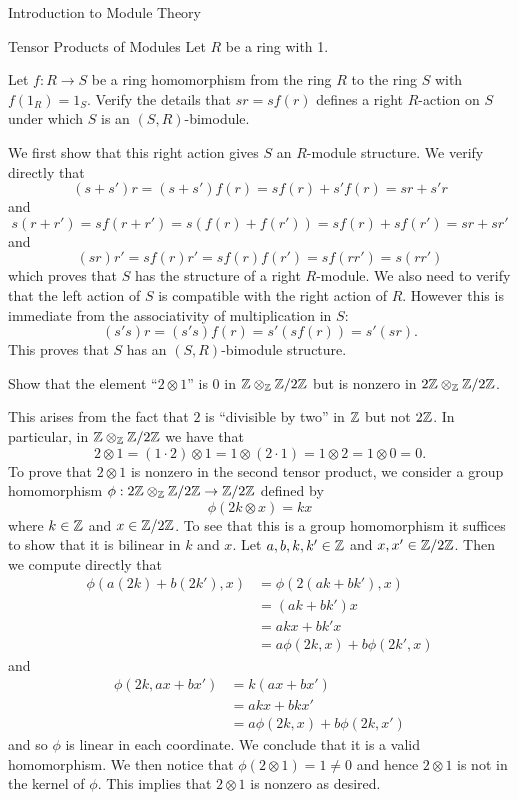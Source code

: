 \begin{chapter}{Introduction to Module Theory}
\begin{section}{Tensor Products of Modules}
Let $R$ be a ring with 1. 
\begin{problem}\label{ex:10.4.1}
Let $f:R\to S$ be a ring homomorphism from the ring $R$ to the ring $S$ with $f(1_R) = 1_S$. Verify the details that $sr = sf(r)$ defines a right $R$-action on $S$ under which $S$ is an $(S,R)$-bimodule. 
\end{problem}
\begin{solution}
We first show that this right action gives $S$ an $R$-module structure. We verify directly that\[
(s+s')r = (s+s')f(r) = sf(r) + s'f(r) = sr + s'r
\]
and \[
s(r+r') = sf(r+r') = s(f(r)+f(r')) = sf(r) + sf(r') = sr + sr'
\]
and \[
(sr)r' = sf(r)r' = sf(r)f(r') = sf(rr')  = s(rr')
\]
which proves that $S$ has the structure of a right $R$-module. We also need to verify that the left action of $S$ is compatible with the right action of $R$. However this is immediate from the associativity of multiplication in $S$:\[
(s's)r = (s's)f(r) = s'(sf(r)) = s'(sr) .
\]
This proves that $S$ has an $(S,R)$-bimodule structure.
\end{solution}\oneperpage



\begin{problem}\label{ex:10.4.2}
Show that the element ``$2\otimes 1$'' is $0$ in $\mathbb{Z}\otimes_{\mathbb{Z}} \mathbb{Z}/2\mathbb{Z}$ but is nonzero in $2\mathbb{Z}\otimes_{\mathbb{Z}} \mathbb{Z}/2\mathbb{Z}$. 
\end{problem}
\begin{solution}
This arises from the fact that $2$ is ``divisible by two'' in $\mathbb{Z}$ but not $2\mathbb{Z}$. In particular, in $\mathbb{Z}\otimes_{\mathbb{Z}} \mathbb{Z}/2\mathbb{Z}$ we have that \[
2\otimes 1  = (1\cdot 2)\otimes 1 = 1\otimes (2\cdot 1) = 1\otimes 2 = 1\otimes 0 = 0.
\]
To prove that $2\otimes 1 $ is nonzero in the second tensor product, we consider a group homomorphism $\phi:2\mathbb{Z}\otimes_{\mathbb{Z}} \mathbb{Z}/2\mathbb{Z} \to \mathbb{Z}/2\mathbb{Z}$ defined by \[
\phi(2k\otimes x) = kx
\]
where $k\in \mathbb{Z}$ and $x\in \mathbb{Z}/2\mathbb{Z}$. To see that this is a group homomorphism it suffices to show that it is bilinear in $k$ and $x$. Let $a,b,k,k'\in \mathbb{Z}$ and $x,x'\in \mathbb{Z}/2\mathbb{Z}$. Then we compute directly that\begin{align*}
\phi(a(2k) + b(2k'), x) &= \phi(2(ak+bk'),x)\\
& =(ak+bk')x\\
& = akx + bk'x\\
& = a\phi(2k,x) + b\phi(2k',x)
\end{align*}
and \begin{align*}
\phi(2k, ax+bx') & = k(ax+bx')\\
& = akx + bkx'\\
& = a\phi(2k,x) + b\phi(2k,x')
\end{align*}
and so $\phi$ is linear in each coordinate. We conclude that it is a valid homomorphism. We then notice that $\phi(2\otimes 1) = 1 \neq 0$ and hence $2\otimes 1$ is not in the kernel of $\phi$. This implies that $2\otimes 1$ is nonzero as desired.


\end{solution}
\end{section}
\end{chapter}
